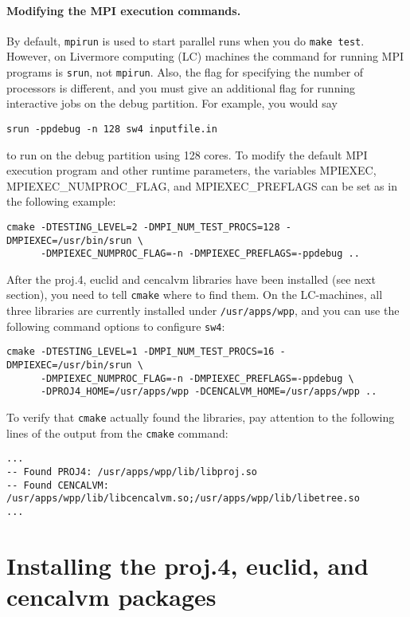 \documentclass[11pt]{article}
\begin{document}
\paragraph{Modifying the MPI execution commands.}
By default, \verb+mpirun+ is used to start parallel runs when you do \verb+make test+.  However, on
Livermore computing (LC) machines the command for running MPI programs is \verb+srun+, not
\verb+mpirun+. Also, the flag for specifying the number of processors is different, and you must
give an additional flag for running interactive jobs on the debug partition. For example, you would
say
\begin{verbatim}
srun -ppdebug -n 128 sw4 inputfile.in
\end{verbatim}
to run on the debug partition using 128 cores. To modify the default MPI execution program and
other runtime parameters, the variables MPIEXEC, MPIEXEC\_NUMPROC\_FLAG, and
MPIEXEC\_PREFLAGS can be set as in the following example:
\begin{verbatim}
cmake -DTESTING_LEVEL=2 -DMPI_NUM_TEST_PROCS=128 -DMPIEXEC=/usr/bin/srun \
      -DMPIEXEC_NUMPROC_FLAG=-n -DMPIEXEC_PREFLAGS=-ppdebug ..
\end{verbatim}

After the proj.4, euclid and cencalvm libraries have been installed (see next section), you need to tell
\verb+cmake+ where to find them. On the LC-machines, all three libraries are currently installed under
\verb+/usr/apps/wpp+, and you can use the following command options to configure \verb+sw4+:
\begin{verbatim}
cmake -DTESTING_LEVEL=1 -DMPI_NUM_TEST_PROCS=16 -DMPIEXEC=/usr/bin/srun \
      -DMPIEXEC_NUMPROC_FLAG=-n -DMPIEXEC_PREFLAGS=-ppdebug \
      -DPROJ4_HOME=/usr/apps/wpp -DCENCALVM_HOME=/usr/apps/wpp ..
\end{verbatim}
To verify that \verb+cmake+ actually found the libraries, pay attention to the
following lines of the output from the \verb+cmake+ command:
\begin{verbatim}
...
-- Found PROJ4: /usr/apps/wpp/lib/libproj.so
-- Found CENCALVM: /usr/apps/wpp/lib/libcencalvm.so;/usr/apps/wpp/lib/libetree.so
...
\end{verbatim}

\section{Installing the proj.4, euclid, and cencalvm packages}\label{sec:cencalvm-install}
 
\end{document}
